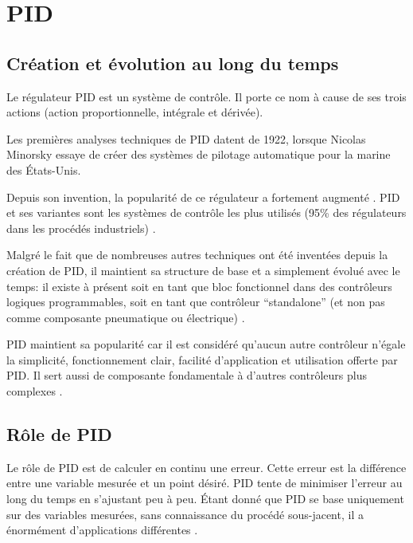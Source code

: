 
\section{PID}

\subsection{Création et évolution au long du temps}

Le régulateur PID est un système de contrôle.
Il porte ce nom à cause de ses trois actions (action proportionnelle, intégrale et dérivée).

Les premières analyses techniques de PID datent de 1922, lorsque Nicolas Minorsky essaye de créer des systèmes de pilotage automatique pour la marine des États-Unis. \cite{minorsky1922directional}

Depuis son invention, la popularité de ce régulateur a fortement augmenté \cite{ang2005pid}.
PID et ses variantes sont les systèmes de contrôle les plus utilisés (95\% des régulateurs dans les procédés industriels) \cite{Kinnaert2013} \cite{Astrom2002}.

Malgré le fait que de nombreuses autres techniques ont été inventées depuis la création de PID, il maintient sa structure de base et a simplement évolué avec le temps:
il existe à présent soit en tant que bloc fonctionnel dans des contrôleurs logiques programmables, soit en tant que contrôleur ``standalone'' (et non pas comme composante pneumatique ou électrique) \cite{visioli2006practical}.

PID maintient sa popularité car il est considéré qu'aucun autre contrôleur n'égale la simplicité, fonctionnement clair, facilité d'application et utilisation offerte par PID.
Il sert aussi de composante fondamentale à d'autres contrôleurs plus complexes \cite{ang2005pid} \cite{visioli2006practical}.

\subsection{Rôle de PID}

Le rôle de PID est de calculer en continu une erreur.
Cette erreur est la différence entre une variable mesurée et un point désiré.
PID tente de minimiser l'erreur au long du temps en s'ajustant peu à peu.
Étant donné que PID se base uniquement sur des variables mesurées, sans connaissance du procédé sous-jacent, il a énormément d'applications différentes \cite{bennett1993history}.

